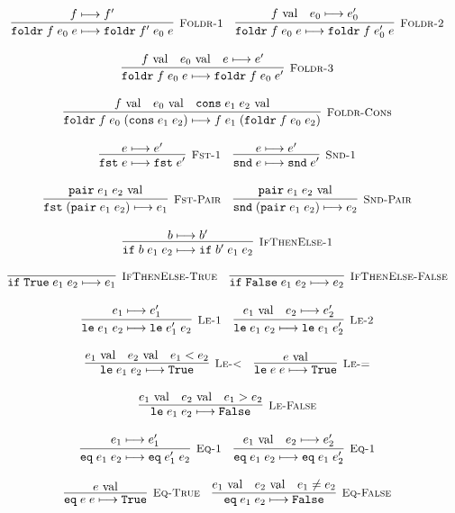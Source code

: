 \documentclass[10pt]{article}
\newcommand{\ttt}[1]{\texttt{#1}}
\newcommand{\reduces}{\ensuremath{\longmapsto}}
\newcommand{\val}{\textnormal{ val}}
\newcommand{\True}{\ttt{True}}
\newcommand{\False}{\ttt{False}}
\newcommand{\cons}{\ttt{cons}}
\newcommand{\foldr}{\ttt{foldr}}
\newcommand{\pair}{\ttt{pair}}
\newcommand{\fst}{\ttt{fst}}
\newcommand{\snd}{\ttt{snd}}
\newcommand{\ite}{\ttt{if}}
\newcommand{\lesseq}{\ttt{le}}
\newcommand{\eq}{\ttt{eq}}
\newcommand{\labinfer} [3] [] {\infer[{\small\textsc{#1}}]{#2}{#3}}
\begin{document}
\[\begin{array}{cc}
    \labinfer[Foldr-1]{\foldr\; f\; e_0\; e \reduces \foldr\; f'\; e_0\; e}{f \reduces f'}
    ~~~
    \labinfer[Foldr-2]{\foldr\; f\; e_0\; e \reduces \foldr\; f\; e_0'\; e}{f \val & e_0 \reduces e_0'}
    \\\\
    \labinfer[Foldr-3]{\foldr\; f\; e_0\; e \reduces \foldr\; f\; e_0\; e'}{f \val & e_0 \val & e \reduces e'}
    \\\\
    \labinfer[Foldr-Cons]{\foldr\; f\; e_0\; (\cons\; e_1\; e_2) \reduces f\; e_1\; (\foldr\; f\; e_0\; e_2)}{f \val & e_0 \val & \cons\; e_1\; e_2 \val}
    \\\\
    \labinfer[Fst-1]{\fst\; e \reduces \fst\; e'}{e \reduces e'}
    ~~~
    \labinfer[Snd-1]{\snd\; e \reduces \snd\; e'}{e \reduces e'}
    \\\\
    \labinfer[Fst-Pair]{\fst\; (\pair\; e_1\; e_2) \reduces e_1}{\pair\; e_1\; e_2 \val}
    ~~~
    \labinfer[Snd-Pair]{\snd\; (\pair\; e_1\; e_2) \reduces e_2}{\pair\; e_1\; e_2 \val}
    \\\\
    \labinfer[IfThenElse-1]{\ite\; b\; e_1\; e_2 \reduces \ite\; b'\; e_1\; e_2}{b \reduces b'}
    \\\\
    \labinfer[IfThenElse-True]{\ite\; \True\; e_1\; e_2 \reduces e_1}{}
    ~~~
    \labinfer[IfThenElse-False]{\ite\; \False\; e_1\; e_2 \reduces e_2}{}
    \\\\
    \labinfer[Le-1]{\lesseq\; e_1\; e_2 \reduces \lesseq\; e_1'\; e_2}{e_1 \reduces e_1'}
    ~~~
    \labinfer[Le-2]{\lesseq\; e_1\; e_2 \reduces \lesseq\; e_1\; e_2'}{e_1 \val & e_2 \reduces e_2'}
    \\\\
    \labinfer[Le-<]{\lesseq\; e_1\; e_2 \reduces \True}{e_1 \val & e_2 \val & e_1 < e_2}
    ~~~
    \labinfer[Le-=]{\lesseq\; e\; e \reduces \True}{e \val}
    \\\\
    \labinfer[Le-False]{\lesseq\; e_1\; e_2 \reduces \False}{e_1 \val & e_2 \val & e_1 > e_2}
    \\\\
    \labinfer[Eq-1]{\eq\; e_1\; e_2 \reduces \eq\; e_1'\; e_2}{e_1 \reduces e_1'}
    ~~~
    \labinfer[Eq-1]{\eq\; e_1\; e_2 \reduces \eq\; e_1\; e_2'}{e_1 \val & e_2 \reduces e_2'}
    \\\\
    \labinfer[Eq-True]{\eq\; e\; e \reduces \True}{e \val}
    ~~~
    \labinfer[Eq-False]{\eq\; e_1\; e_2 \reduces \False}{e_1 \val & e_2 \val & e_1 \neq e_2}
    
  \end{array}
\]
\end{document}
